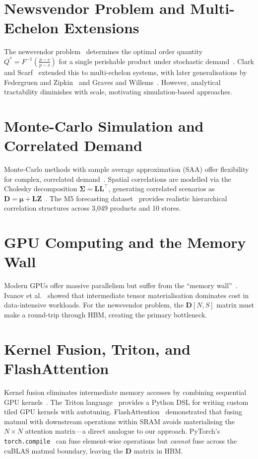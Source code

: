 \section{Newsvendor Problem and Multi-Echelon Extensions}

The newsvendor problem~\citep{arrow1951} determines the optimal order quantity $Q^* = F^{-1}\!\left(\frac{p-c}{p-s}\right)$ for a single perishable product under stochastic demand~\citep{porteus2002}. Clark and Scarf~\citep{clark1960} extended this to multi-echelon systems, with later generalisations by Federgruen and Zipkin~\citep{federgruen1984} and Graves and Willems~\citep{graves2000}. However, analytical tractability diminishes with scale, motivating simulation-based approaches.

\section{Monte-Carlo Simulation and Correlated Demand}

Monte-Carlo methods with sample average approximation (SAA) offer flexibility for complex, correlated demand~\citep{birge2011, shapiro2014}. Spatial correlations are modelled via the Cholesky decomposition $\bm{\Sigma} = \mathbf{L}\mathbf{L}^\top$, generating correlated scenarios as $\mathbf{D} = \bm{\mu} + \mathbf{L}\mathbf{Z}$~\citep{glasserman2003}. The M5 forecasting dataset~\citep{makridakis2022} provides realistic hierarchical correlation structures across 3,049 products and 10 stores.

\section{GPU Computing and the Memory Wall}

Modern GPUs offer massive parallelism but suffer from the ``memory wall''~\citep{wulf1995}. Ivanov et al.~\citep{ivanov2021} showed that intermediate tensor materialisation dominates cost in data-intensive workloads. For the newsvendor problem, the $\mathbf{D}[N,S]$ matrix must make a round-trip through HBM, creating the primary bottleneck.

\section{Kernel Fusion, Triton, and FlashAttention}

Kernel fusion eliminates intermediate memory accesses by combining sequential GPU kernels~\citep{wang2010}. The Triton language~\citep{tillet2019} provides a Python DSL for writing custom tiled GPU kernels with autotuning. FlashAttention~\citep{dao2022, dao2023} demonstrated that fusing matmul with downstream operations within SRAM avoids materialising the $N \times N$ attention matrix---a direct analogue to our approach. PyTorch's \texttt{torch.compile}~\citep{ansel2024} can fuse element-wise operations but \emph{cannot} fuse across the cuBLAS matmul boundary, leaving the $\mathbf{D}$ matrix in HBM.

